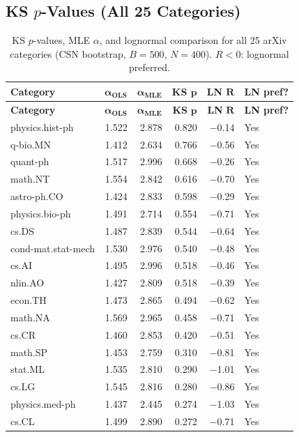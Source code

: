 \documentclass[11pt,letterpaper]{article}
\newcommand{\al}{\alpha}
\begin{document}
\subsection{KS $p$-Values (All 25 Categories)}

\begin{longtable}{lrrrrl}
\caption{KS $p$-values, MLE $\al$, and lognormal comparison for
all 25 arXiv categories (CSN bootstrap, $B = 500$, $N = 400$).
$R < 0$: lognormal preferred.} \\
\toprule
\textbf{Category} & $\boldsymbol{\al_{\text{OLS}}}$ &
$\boldsymbol{\al_{\text{MLE}}}$ & \textbf{KS} $\boldsymbol{p}$ &
\textbf{LN} $\boldsymbol{R}$ & \textbf{LN pref?} \\
\midrule
\endfirsthead
\toprule
\textbf{Category} & $\boldsymbol{\al_{\text{OLS}}}$ &
$\boldsymbol{\al_{\text{MLE}}}$ & \textbf{KS} $\boldsymbol{p}$ &
\textbf{LN} $\boldsymbol{R}$ & \textbf{LN pref?} \\
\midrule
\endhead
physics.hist-ph & 1.522 & 2.878 & 0.820 & $-$0.14 & Yes \\
q-bio.MN & 1.412 & 2.634 & 0.766 & $-$0.56 & Yes \\
quant-ph & 1.517 & 2.996 & 0.668 & $-$0.26 & Yes \\
math.NT & 1.554 & 2.842 & 0.616 & $-$0.70 & Yes \\
astro-ph.CO & 1.424 & 2.833 & 0.598 & $-$0.29 & Yes \\
physics.bio-ph & 1.491 & 2.714 & 0.554 & $-$0.71 & Yes \\
cs.DS & 1.487 & 2.839 & 0.544 & $-$0.64 & Yes \\
cond-mat.stat-mech & 1.530 & 2.976 & 0.540 & $-$0.48 & Yes \\
cs.AI & 1.495 & 2.996 & 0.518 & $-$0.46 & Yes \\
nlin.AO & 1.427 & 2.809 & 0.518 & $-$0.39 & Yes \\
econ.TH & 1.473 & 2.865 & 0.494 & $-$0.62 & Yes \\
math.NA & 1.569 & 2.965 & 0.458 & $-$0.71 & Yes \\
cs.CR & 1.460 & 2.853 & 0.420 & $-$0.51 & Yes \\
math.SP & 1.453 & 2.759 & 0.310 & $-$0.81 & Yes \\
stat.ML & 1.535 & 2.810 & 0.290 & $-$1.01 & Yes \\
cs.LG & 1.545 & 2.816 & 0.280 & $-$0.86 & Yes \\
physics.med-ph & 1.437 & 2.445 & 0.274 & $-$1.03 & Yes \\
cs.CL & 1.499 & 2.890 & 0.272 & $-$0.71 & Yes \\

\end{longtable}
\end{document}
